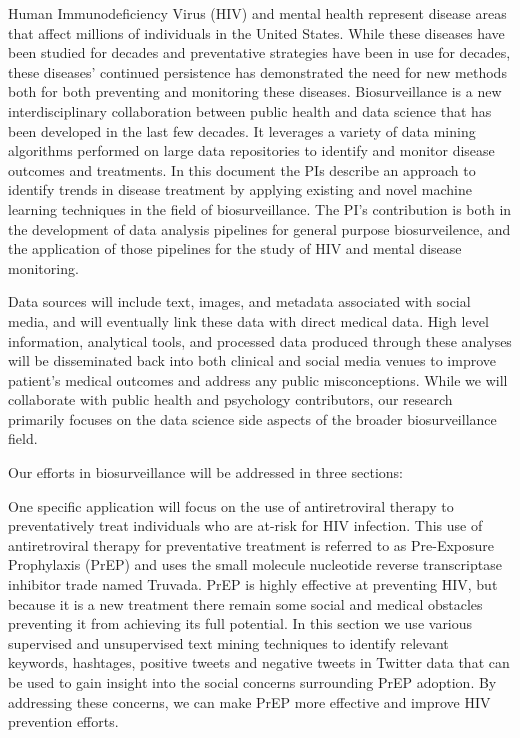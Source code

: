 


Human Immunodeficiency Virus (HIV) and mental health represent disease areas that affect millions of individuals in the United States. While these diseases have been studied for decades and preventative strategies have been in use for decades, these diseases' continued persistence has demonstrated the need for new methods both for both preventing and monitoring these diseases. Biosurveillance is a new interdisciplinary collaboration between public health and data science that has been developed in the last few decades. It leverages a variety of data mining algorithms performed on large data repositories to identify and monitor disease outcomes and treatments. In this document the PIs describe an approach to identify trends in disease treatment by applying existing and novel machine learning techniques in the field of biosurveillance. The PI's contribution is both in the development of data analysis pipelines for general purpose biosurveilence, and the application of those pipelines for the study of HIV and mental disease monitoring.

Data sources will include text, images, and metadata associated with social media, and will eventually link these data with direct medical data. High level information, analytical tools, and processed data produced through these analyses will be disseminated back into both clinical and social media venues to improve patient's medical outcomes and address any public misconceptions. While we will collaborate with public health and psychology contributors, our research primarily focuses on the data science side aspects of the broader biosurveillance field.

Our efforts in biosurveillance will be addressed in three sections:

One specific application will focus on the use of antiretroviral therapy to preventatively treat individuals who are at-risk for HIV infection. This use of antiretroviral therapy for preventative treatment is referred to as Pre-Exposure Prophylaxis (PrEP) and uses the small molecule nucleotide reverse transcriptase inhibitor trade named Truvada. PrEP is highly effective at preventing HIV, but because it is a new treatment there remain some social and medical obstacles preventing it from achieving its full potential. In this section we use various supervised and unsupervised text mining techniques to identify relevant keywords, hashtages, positive tweets and negative tweets in Twitter data that can be used to gain insight into the social concerns surrounding PrEP adoption. By addressing these concerns, we can make PrEP more effective and improve HIV prevention efforts.

